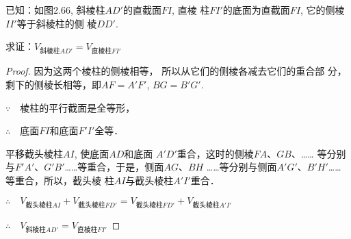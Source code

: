 \begin{example}
    已知：如图2.66, 斜棱柱$AD'$的直截面$FI$, 直棱
柱$FI'$的底面为直截面$FI$, 它的侧棱$II'$等于斜棱柱的侧
棱$DD'$.

求证：$V_{\text{斜棱柱}AD'}=V_{\text{直棱柱}FI'}$
\end{example}

\begin{proof}
因为这两个棱柱的侧棱相等，
所以从它们的侧棱各减去它们的重合部
分，剩下的侧棱长相等，即$AF=A'F'$, $BG=B'G'$.

$\because\quad $棱柱的平行截面是全等形，

$\therefore\quad $底面$FI$和底面$F'I'$全等．

平移截头棱柱$AI$, 使底面$AD$和底面
$A'D'$重合，这时的侧棱$FA$、$GB$、……
等分别与$F'A'$、$G'B'$……等重合，于是，侧面$AG$、$BH$
……等分别与侧面$A'G'$、$B'H'$……等重合，所以，截头棱
柱$AI$与截头棱柱$A'I'$重合．

$\therefore\quad V_{\text{截头棱柱}AI}+V_{\text{截头棱柱}FD'}=V_{\text{截头棱柱}FD'}+V_{\text{截头棱柱}A'I'}$

$\therefore\quad V_{\text{斜棱柱}AD'}=V_{\text{直棱柱}FI'}$
\end{proof}

